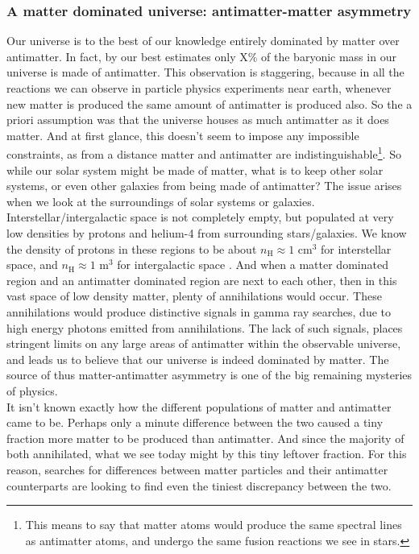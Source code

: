 \subsubsection{A matter dominated universe: antimatter-matter asymmetry}
Our universe is to the best of our knowledge entirely dominated by matter over antimatter. In fact, by our best estimates only X\% of the baryonic mass in our universe is made of antimatter. This observation is staggering, because in all the reactions we can observe in particle physics experiments near earth, whenever new matter is produced the same amount of antimatter is produced also\cite{}. So the a priori assumption was that the universe houses as much antimatter as it does matter. And at first glance, this doesn't seem to impose any impossible constraints, as from a distance matter and antimatter are indistinguishable\footnote{This means to say that matter atoms would produce the same spectral lines as antimatter atoms, and undergo the same fusion reactions we see in stars.}. So while our solar system might be made of matter, what is to keep other solar systems, or even other galaxies from being made of antimatter? The issue arises when we look at the surroundings of solar systems or galaxies. Interstellar/intergalactic space is not completely empty, but populated at very low densities by protons and helium-4 from surrounding stars/galaxies. We know the density of protons in these regions to be about $n_\mathrm{H} \approx 1$ cm$^3$ for interstellar space\cite{}, and $n_\mathrm{H} \approx 1$ m$^3$ for intergalactic space \cite{}. And when a matter dominated region and an antimatter dominated region are next to each other, then in this vast space of low density matter, plenty of annihilations would occur. These annihilations would produce distinctive signals in gamma ray searches\cite{}, due to high energy photons emitted from annihilations. The lack of such signals\cite{}, places stringent limits on any large areas of antimatter within the observable universe, and leads us to believe that our universe is indeed dominated by matter. The source of thus matter-antimatter asymmetry is one of the big remaining mysteries of physics.  \\

It isn't known exactly how the different populations of matter and antimatter came to be. Perhaps only a minute difference between the two caused a tiny fraction more matter to be produced than antimatter. And since the majority of both annihilated, what we see today might by this tiny leftover fraction. For this reason, searches for differences between matter particles and their antimatter counterparts are looking to find even the tiniest discrepancy between the two\cite{}. 

